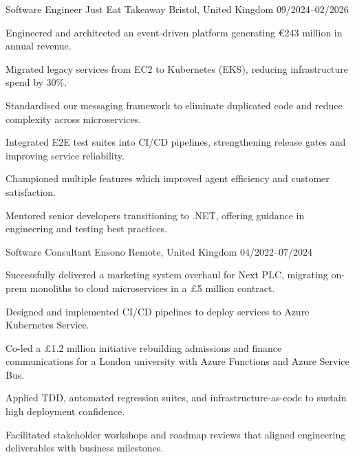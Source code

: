 \begin{cventries}
\cventry%
  {Software Engineer} %
  {Just Eat Takeaway} %
  {Bristol, United Kingdom} %
  {09/2024--02/2026} %
  {
    \begin{cvitems}
      \item Engineered and architected an event-driven platform generating $\euro$243 million in annual revenue.
      \item Migrated legacy services from EC2 to Kubernetes (EKS), reducing infrastructure spend by 30\%.
      \item Standardised our messaging framework to eliminate duplicated code and reduce complexity across microservices.
      \item Integrated E2E test suites into CI/CD pipelines, strengthening release gates and improving service reliability.
      \item Championed multiple features which improved agent efficiency and customer satisfaction.
      \item Mentored senior developers transitioning to .NET, offering guidance in engineering and testing best practices.
    \end{cvitems}
  }


\cventry%
  {Software Consultant} %
  {Ensono} %
  {Remote, United Kingdom} %
  {04/2022--07/2024} %
  {
    \begin{cvitems}
      \item Successfully delivered a marketing system overhaul for Next PLC, migrating on-prem monoliths to cloud microservices in a $\pounds$5 million contract.
      \item Designed and implemented CI/CD pipelines to deploy services to Azure Kubernetes Service.
      \item Co-led a $\pounds$1.2 million initiative rebuilding admissions and finance communications for a London university with Azure Functions and Azure Service Bus.
      \item Applied TDD, automated regression suites, and infrastructure-as-code to sustain high deployment confidence.
      \item Facilitated stakeholder workshops and roadmap reviews that aligned engineering deliverables with business milestones.
    \end{cvitems}
  }



\end{cventries}
